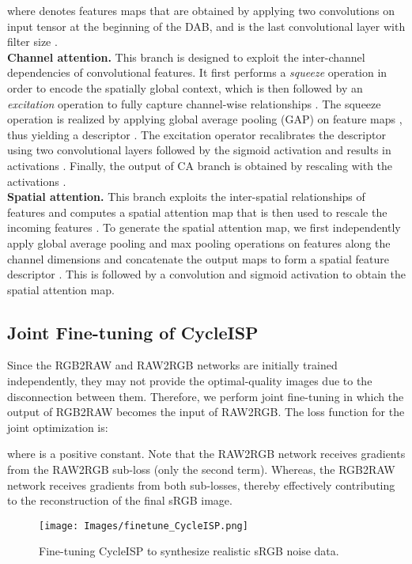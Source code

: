 \documentclass[10pt,twocolumn,letterpaper]{article}
\begin{document}
where  denotes features maps that are obtained by applying two convolutions on input tensor  at the beginning of the DAB, and  is the last convolutional layer with filter size . 
\vspace{0.4em}\\
\noindent \textbf{Channel attention.} This branch is designed to exploit the inter-channel dependencies of convolutional features.
It first performs a \emph{squeeze} operation in order to encode the spatially global context, which is then followed by an \emph{excitation} operation to fully capture channel-wise relationships  \cite{hu2018squeeze}. 
The squeeze operation is realized by applying global average pooling (GAP) on feature maps , thus yielding a descriptor . 
The excitation operator recalibrates the descriptor  using two convolutional layers followed by the sigmoid activation and results in activations . 
Finally, the output of CA branch is obtained by rescaling  with the activations .
\vspace{0.4em}\\
\noindent \textbf{Spatial attention.} This branch exploits the inter-spatial relationships of features and computes a spatial attention map that is then used to rescale the incoming features . 
To generate the spatial attention map, we first independently apply global average pooling and max pooling operations on features  along the channel dimensions and concatenate the output maps to form a spatial feature descriptor . 
This is followed by a convolution and sigmoid activation to obtain the spatial attention map. 

\subsection{Joint Fine-tuning of CycleISP}
\label{sec:finetune}
Since the RGB2RAW and RAW2RGB networks are initially trained independently, they may not provide the optimal-quality images due to the disconnection between them. 
Therefore, we perform joint fine-tuning in which the output of RGB2RAW becomes the input of RAW2RGB. 
The loss function for the joint optimization is:

where  is a positive constant. 
Note that the RAW2RGB network receives gradients from the RAW2RGB sub-loss (only the second term). 
Whereas, the RGB2RAW network receives gradients from both sub-losses, thereby effectively contributing to the reconstruction of the final sRGB image. 


\begin{figure}[t!]
\begin{center}
 \texttt{[image: Images/finetune\_CycleISP.png]}  
\end{center}\vspace{-1.4em}
    \caption{Fine-tuning CycleISP to synthesize realistic sRGB noise data.}\vspace{-2mm}
    \label{Fig:finetune}
\end{figure}
\end{document}
